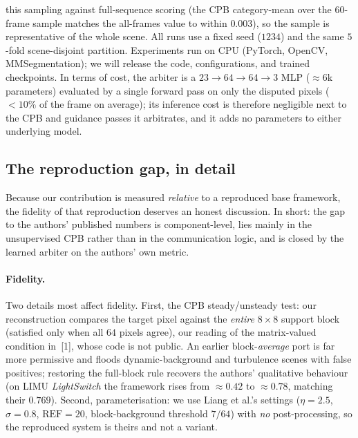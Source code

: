 \documentclass[sn-basic]{sn-jnl}
\begin{document}
this sampling against full-sequence scoring (the CPB category-mean over the $60$-frame
sample matches the all-frames value to within $0.003$), so the sample is representative of
the whole scene. All runs use
a fixed seed ($1234$) and the same $5$-fold scene-disjoint partition. Experiments
run on CPU (PyTorch, OpenCV, MMSegmentation); we will release the code, configurations,
and trained checkpoints. In terms of cost, the arbiter is a $23\!\rightarrow\!64\!\rightarrow\!64\!\rightarrow\!3$
MLP ($\approx6$k parameters) evaluated by a single forward pass on only the disputed
pixels ($<10\%$ of the frame on average); its inference cost is therefore negligible
next to the CPB and guidance passes it arbitrates, and it adds no parameters to either
underlying model.

\subsection{The reproduction gap, in detail}
\label{sec:repro}
Because our contribution is measured \emph{relative} to a reproduced base framework, the
fidelity of that reproduction deserves an honest discussion. In short: the gap to the
authors' published numbers is component-level, lies mainly in the unsupervised CPB rather
than in the communication logic, and is closed by the learned arbiter on the authors' own
metric.

\paragraph{Fidelity.} Two details most affect fidelity. First, the CPB steady/unsteady
test: our reconstruction compares the target pixel against the \emph{entire} $8\times8$
support block (satisfied only when all $64$ pixels agree), our reading of the
matrix-valued condition in~[1], whose code is not public. An earlier block-\emph{average}
port is far more permissive and floods dynamic-background and turbulence scenes with false
positives; restoring the full-block rule recovers the authors' qualitative behaviour (on
LIMU \textit{LightSwitch} the framework rises from $\approx0.42$ to $\approx0.78$, matching
their $0.769$). Second, parameterisation: we use Liang et al.'s settings ($\eta=2.5$,
$\sigma=0.8$, $\mathrm{REF}=20$, block-background threshold $7/64$) with \emph{no}
post-processing, so the reproduced system is theirs and not a variant.
\end{document}
